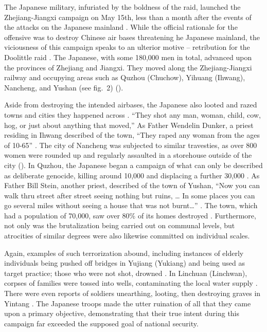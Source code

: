The Japanese military, infuriated by the boldness of the raid, launched the Zhejiang-Jiangxi campaign on May 15th, less than a month after the events of the attacks on the Japanese mainland \autocite[p.\ 386]{Schoppa2011SeaOfBitterness}. While the official rationale for the offensive was to destroy Chinese air bases threatening he Japanese mainland, the viciousness of this campaign speaks to an ulterior motive – retribution for the Doolittle raid \autocite[pp.\ 375--376]{Scott2015TargetTokyo}. The Japanese, with some 180,000 men in total, advanced upon the provinces of Zhejiang and Jiangxi. They moved along the Zhejiang-Jiangxi railway and occupying areas such as Quzhou (Chuchow), Yihuang (Ihwang), Nancheng, and Yushan (see fig.\ 2) (\cites[p.\ 28]{Schoppa2011SeaOfBitterness}{Carter2023ComplexLegacyDoolittleRaid}{Zhao2016LifetimeOfSufferingChinaDaily}).

Aside from destroying the intended airbases, the Japanese also looted and razed towns and cities they happened across \autocite[chap.\ 22]{Scott2015TargetTokyo}. “They shot any man, woman, child, cow, hog, or just about anything that moved,” As Father Wendelin Dunker, a priest residing in Ihwang described of the town, “They raped any woman from the ages of 10-65” \autocite[p.\ 381]{Scott2015TargetTokyo}. The city of Nancheng was subjected to similar travesties, as over 800 women were rounded up and regularly assaulted in a storehouse outside of the city (\cites[p.\ 382]{Scott2018MilitaryTimesRipples}). In Quzhou, the Japanese began a campaign of what can only be described as deliberate genocide, killing around 10,000 and displacing a further 30,000 \autocite[p.\ 385]{Scott2015TargetTokyo}. As Father Bill Stein, another priest, described of the town of Yushan, “Now you can walk thru street after street seeing nothing but ruins, … In some places you can go several miles without seeing a house that was not burnt…” \autocite[p.\ 385]{Scott2015TargetTokyo}. The town, which had a population of 70,000, saw over 80\% of its homes destroyed \autocite[p.\ 166]{Yamamoto2000Nanking}. Furthermore, not only was the brutalization being carried out on communal levels, but atrocities of similar degrees were also likewise committed on individual scales.

Again, examples of such terrorization abound, including instances of elderly individuals being pushed off bridges in Yujiang (Yukiang) and being used as target practice; those who were not shot, drowned \autocite[p.\ 382]{Scott2015TargetTokyo}. In Linchuan (Linchwan), corpses of families were tossed into wells, contaminating the local water supply \autocite[p.\ 383]{Scott2015TargetTokyo}. There were even reports of soldiers unearthing, looting, then destroying graves in Yintang \autocite[p.\ 383]{Scott2015TargetTokyo}. The Japanese troops made the utter ruination of all that they came upon a primary objective, demonstrating that their true intent during this campaign far exceeded the supposed goal of national security.

